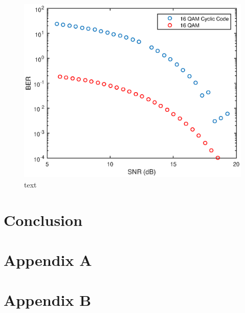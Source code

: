 \documentclass{article}
\begin{document}
\begin{figure}[H]
	\centering
	\includegraphics[scale=0.7]{fig2}
	\caption{text}
\end{figure}

\section{Conclusion}




\section{Appendix A}




\section{Appendix B}
\end{document}
